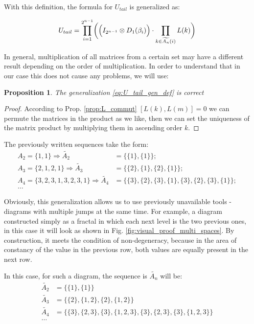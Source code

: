 \documentclass[a4paper, openany, 12pt]{article}
\newtheorem{prop}{Proposition}
\theoremstyle{remark}
\theoremstyle{definition}
\newcommand{\ot}{\otimes}
\begin{document}
With this definition, the formula for $U_{tail}$ is generalized as:

\begin{equation}
    U_{tail} = \prod_{i=1}^{2^{n-1}} \biggl( \Bigl(I_{2^{n-1}} \ot D_1(\beta_i)\Bigr) \cdot \prod_{k\in \widetilde{A_n}(i)} L(k) \biggr)
    \label{eq:U_tail_gen_def}
\end{equation}

In general, multiplication of all matrices from a certain set may have a different result depending on the order of multiplication. In order to understand that in our case this does not cause any problems, we will use:
\begin{prop}
    The generalization \eqref{eq:U_tail_gen_def} is correct

\end{prop}

\begin{proof}
     According to Prop. \ref{prop:L_commut} $[L(k),L(m)] = 0$ we can permute the matrices in the product as we like, then we can set the uniqueness of the matrix product by multiplying them in ascending order $k$.
\end{proof}

The previously written sequences take the form:
\begin{align}
    A_2 = \{1,1\} \Rightarrow \widetilde{A_2} &= \{\{1\}, \{1\}\};\\
    A_3 = \{2,1,2,1\} \Rightarrow \widetilde{A_3} &= \{\{2\},\{1\},\{2\}, \{1\}\};\\
    A_4 = \{3,2,3,1,3,2,3,1\} \Rightarrow \widetilde{A_4} &= \{\{3\},\{2\},\{3\},\{1\},\{3\},\{2\},\{3\},\{1\}\};\\
    \dots
\end{align}

Obviously, this generalization allows us to use previously unavailable tools - diagrams with multiple jumps at the same time.
For example, a diagram constructed simply as a fractal in which each next level is the two previous ones, in this case it will look as shown in Fig. \ref{fig:visual_proof_multi_spaces}. By construction, it meets the condition of non-degeneracy, because in the area of constancy of the value in the previous row, both values are equally present in the next row.

In this case, for such a diagram, the sequence is $\widetilde{A_n}$ will be:
\begin{align}
    \widetilde{A_2} &= \{\{1\},\{1\}\}\\
    \widetilde{A_3} &= \{\{2\},\{1,2\},\{2\},\{1,2\}\}\\
    \widetilde{A_4} &= \{\{3\},\{2,3\},\{3\},\{1,2,3\},\{3\},\{2,3\},\{3\},\{1,2,3\}\}\\
    \dots
\end{align}
\end{document}

